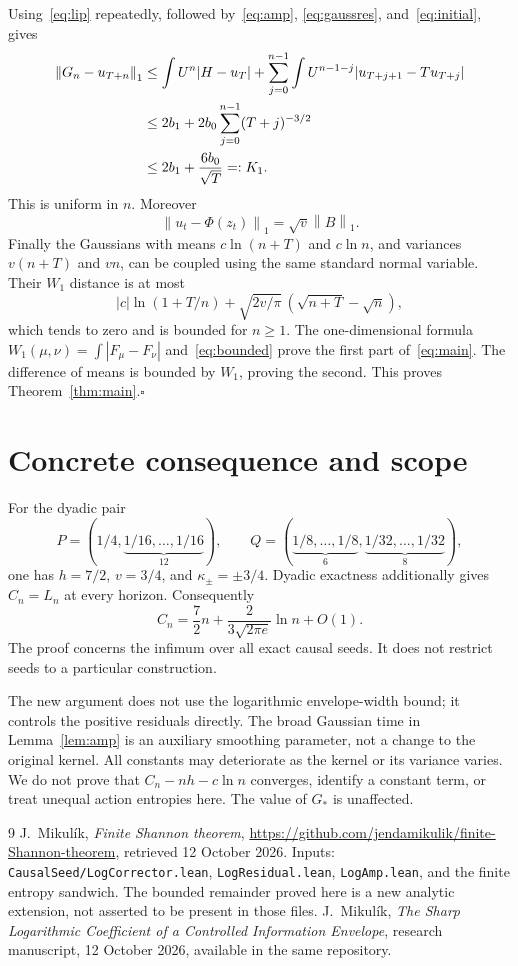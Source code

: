 \documentclass[11pt]{article}
\newcommand{\norm}[1]{\left\|#1\right\|_1}
\begin{document}
Using~\eqref{eq:lip} repeatedly, followed by~\eqref{eq:amp},
\eqref{eq:gaussres}, and~\eqref{eq:initial}, gives
\begin{align}
 \norm{G_n-u_{T+n}}
 &\le\int U^n|H-u_T|
    +\sum_{j=0}^{n-1}\int U^{n-1-j}|u_{T+j+1}-Tu_{T+j}|\notag\\
 &\le2b_1+2b_0\sum_{j=0}^{n-1}(T+j)^{-3/2}\notag\\
 &\le2b_1+\frac{6b_0}{\sqrt T}=:K_1.\label{eq:bounded}
\end{align}
This is uniform in $n$. Moreover
\[
 \norm{u_t-\Phi(z_t)}=\sqrt v\norm B.
\]
Finally the Gaussians with means $c\ln(n+T)$ and $c\ln n$,
and variances $v(n+T)$ and $vn$, can be coupled using the same
standard normal variable. Their $W_1$ distance is at most
\[
 |c|\ln(1+T/n)
 +\sqrt{2v/\pi}\,(\sqrt{n+T}-\sqrt n),
\]
which tends to zero and is bounded for $n\ge1$.
The one-dimensional formula $W_1(\mu,\nu)=\int|F_\mu-F_\nu|$
and~\eqref{eq:bounded} prove the first part of~\eqref{eq:main}.
The difference of means is bounded by $W_1$, proving the second.
This proves Theorem~\ref{thm:main}.\hfill$\square$

\section{Concrete consequence and scope}
For the dyadic pair
\[
 P=(1/4,\underbrace{1/16,\ldots,1/16}_{12}),\qquad
 Q=(\underbrace{1/8,\ldots,1/8}_{6},
       \underbrace{1/32,\ldots,1/32}_{8}),
\]
one has $h=7/2$, $v=3/4$, and $\kappa_\pm=\pm3/4$.
Dyadic exactness additionally gives $C_n=L_n$ at every horizon.
Consequently
\[
 \boxed{C_n=\frac72n+\frac{2}{3\sqrt{2\pi e}}\ln n+O(1).}
\]
The proof concerns the infimum over all exact causal seeds. It does
not restrict seeds to a particular construction.

The new argument does not use the logarithmic envelope-width bound;
it controls the positive residuals directly. The broad Gaussian time
in Lemma~\ref{lem:amp} is an auxiliary smoothing parameter, not a
change to the original kernel. All constants may deteriorate as the
kernel or its variance varies. We do not prove that
$C_n-nh-c\ln n$ converges, identify a constant term, or treat
unequal action entropies here. The value of $G_\ast$ is unaffected.

\begin{thebibliography}{9}
 J.~Mikul\'ik, \emph{Finite Shannon theorem},
\url{https://github.com/jendamikulik/finite-Shannon-theorem},
retrieved 12 October 2026. Inputs:
\texttt{CausalSeed/LogCorrector.lean},
\texttt{LogResidual.lean}, \texttt{LogAmp.lean}, and the finite
entropy sandwich. The bounded remainder proved here is a new
analytic extension, not asserted to be present in those files.
 J.~Mikul\'ik, \emph{The Sharp Logarithmic Coefficient
of a Controlled Information Envelope}, research manuscript,
12 October 2026, available in the same repository.
\end{thebibliography}
\end{document}
